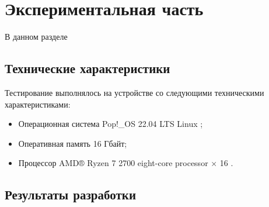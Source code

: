 \section{Экспериментальная часть}

В данном разделе

\subsection{Технические характеристики}
Тестирование выполнялось на устройстве со следующими техническими характеристиками:
\begin{itemize}
	\item Операционная система Pop!\_OS 22.04 LTS \cite{popos} Linux \cite{Linux};
	\item Оперативная память 16 Гбайт;
	\item Процессор AMD® Ryzen 7 2700 eight-core processor × 16 \cite{amd}.
\end{itemize}

\subsection{Результаты разработки}
